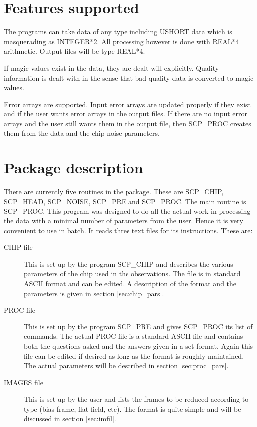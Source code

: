\section{Features supported}

The programs can take data of any type including USHORT data which is
masquerading as INTEGER*2. All processing however is done with REAL*4
arithmetic.  Output files will be type REAL*4.

If magic values exist in the data, they are dealt will explicitly. Quality
information is dealt with in the sense that bad quality data is converted to
magic values.

Error arrays are supported.  Input error arrays are updated properly if they
exist and if the user wants error arrays in the output files.  If there are no
input error arrays and the user still wants them in the output file, then
SCP\_PROC creates them from the data and the chip noise parameters.

\section{Package description}

There are currently five routines in the package.  These are SCP\_CHIP,
SCP\_HEAD, SCP\_NOISE, SCP\_PRE and SCP\_PROC. The main routine is SCP\_PROC.
This program was designed to do all the actual work in processing the data with
a minimal number of parameters from the user.  Hence it is very convenient to
use in batch. It reads three text files for its instructions. These are:

\begin{description}

\item [CHIP file]This is set up by the program SCP\_CHIP and describes the
various parameters of the chip used in the observations. The file is in
standard ASCII format and can be edited.  A description of the format and the
parameters is given in section \ref{sec:chip_pars}.

\item [PROC file] This is set up by the program SCP\_PRE and gives SCP\_PROC
its list of commands.  The actual PROC file is a standard ASCII file and
contains both the questions asked and  the answers given in a set format. Again
this file can be edited if desired as long as the format is roughly maintained.
The actual parameters will be described in section \ref{sec:proc_pars}.

\item [IMAGES file]This is set up by the user and lists the frames to be
reduced according to type (bias frame, flat field, etc). The format is quite
simple and will be discussed in section \ref{sec:imfil}.

\end{description}


